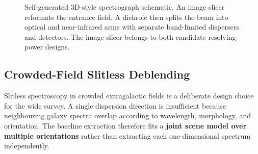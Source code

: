 \begin{figure}[htbp]
\caption{Self-generated 3D-style spectrograph schematic. An image slicer reformats the entrance field. A dichroic then splits the beam into optical and near-infrared arms with separate band-limited dispersers and detectors. The image slicer belongs to both candidate resolving-power designs.}
\label{fig:spectrograph}
\end{figure}

\subsection{Crowded-Field Slitless Deblending}\label{sec:deblending}

Slitless spectroscopy in crowded extragalactic fields is a deliberate design choice for the wide survey. A single dispersion direction is insufficient because neighbouring galaxy spectra overlap according to wavelength, morphology, and orientation. The baseline extraction therefore fits a \textbf{joint scene model over multiple orientations} rather than extracting each one-dimensional spectrum independently.

